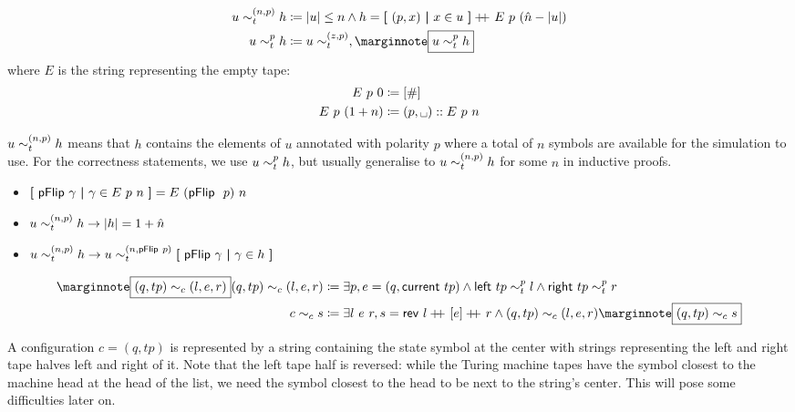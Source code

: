 \begin{definition}
  \begin{align*}
    u \reprtt{n}{p} h &\defeq \length{u} \le n \land h = \withl(p, x) \withm x \in u\withr \concat \nilstr{p}{(\hat{n} - \length{u})}\\
  u \reprt{p} h &\defeq u \reprtt{z}{p}, \mnote{$ u \reprt{p} h$}
  \end{align*}
  where $E$ is the string representing the empty tape:
  \begin{align*}
    \nilstr{p}{0} &\defeq [\#] \\
    \nilstr{p}{(\natS{n})} &\defeq (p, \blank) :: \nilstr{p}{n}
  \end{align*}
\end{definition}
$u \sim_t^{(n, p)} h$ means that $h$ contains the elements of $u$ annotated with polarity $p$ where a total of $n$ symbols are available for the simulation to use.
For the correctness statements, we use $u \sim_t^{p} h$, but usually generalise to $u \sim_t^{(n, p)} h$ for some $n$ in inductive proofs. 

\begin{proposition}\label{prop:tapefacts}\leavevmode
  \begin{itemize}
    \item $\textbf{[}~ \textsf{pFlip}~\gamma ~\textbf{|}~ \gamma \in E~p~n ~\textbf{]} = E~(\textsf{pFlip}~~p)~n$
    \item $u \sim_t^{(n, p)} h \rightarrow |h| = 1 +{\hat{n}}$
    \item $u \sim_t^{(n, p)} h \rightarrow u \sim_t^{(n, \textsf{pFlip}~p)} \textbf{[}~ \textsf{pFlip}~\gamma ~\textbf{|}~ \gamma \in h ~\textbf{]}$
  \end{itemize}
\end{proposition}

\begin{definition}
  \begin{align*}
    \mnote{$ (q, tp) \reprc{} (l, e, r)$}
    (q, tp) \reprc{} (l, e, r) &\defeq \exists p, e = (q, \tmcurrent{tp}) \land \tmleft{tp} \reprt{p} l \land \tmright{tp} \reprt{p} r \\
    c \reprc{} s &\defeq \exists l~ e~ r, s = \rev~{l} \concat{} [e] \concat{} r \land (q, tp) \reprc{} (l, e, r) \mnote{$ (q, tp) \reprc{} s$}
  \end{align*}
\end{definition}
A configuration $c = (q, tp)$ is represented by a string containing the state symbol at the center with strings representing the left and right tape halves left and right of it. Note that the left tape half is reversed: while the Turing machine tapes have the symbol closest to the machine head at the head of the list, we need the symbol closest to the head to be next to the string's center. This will pose some difficulties later on.


